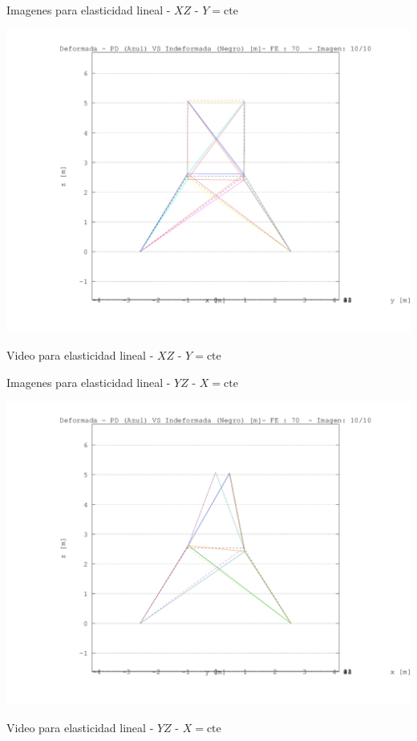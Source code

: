 \documentclass[a4paper,11pt]{article}
\begin{document}
\newpage       
\begin{center}       
Imagenes para elasticidad lineal -  $XZ$ - $Y=\text{cte}$ 

\includegraphics[width=.80\textwidth]{../../XY_XZ_YZ/XZ/deformada/torre_deformada_XZ_10.png}      


Video para elasticidad lineal -  $XZ$ - $Y=\text{cte}$ 


\end{center}       
\newpage       
\begin{center}       
Imagenes para elasticidad lineal -  $YZ$ - $X=\text{cte}$ 

\includegraphics[width=.80\textwidth]{../../XY_XZ_YZ/YZ/deformada/torre_deformada_YZ_10.png}      


Video para elasticidad lineal -  $YZ$ - $X=\text{cte}$ 


\end{center}       
\end{document}
